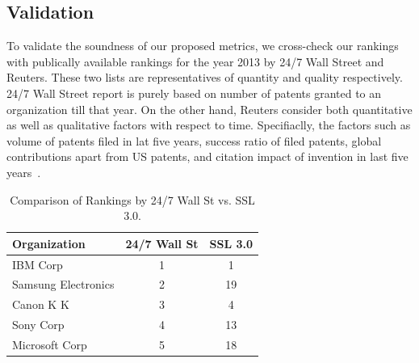\subsection{Validation}

To validate the soundness of our proposed metrics, we cross-check our rankings with publically available rankings for the year 2013 by 24/7 Wall Street and Reuters. These two lists are representatives of quantity and quality respectively. 
24/7 Wall Street report is purely based on number of patents granted to an organization till that year. 
On the other hand, Reuters consider both quantitative as well as qualitative factors with respect to time. Specifiaclly, the factors such as volume of patents filed in lat five years, success ratio of filed patents, global contributions apart from US patents, and citation impact of invention in last five years~\cite{reuters-method}. 



\begin{table}[h]
\centering
\begin{tabular}{|l|c|c|}
\hline
\textbf{Organization}        & \multicolumn{1}{l|}{\textbf{24/7 Wall St}} & \multicolumn{1}{l|}{\textbf{SSL 3.0}} \\ \hline
IBM Corp                     & 1                                          & 1                                         \\ \hline
Samsung Electronics          & 2                                          & 19                                        \\ \hline
Canon K K                    & 3                                          & 4                                         \\ \hline
Sony Corp                    & 4                                          & 13                                        \\ \hline
Microsoft Corp               & 5                                          & 18                                        \\ \hline
\end{tabular}
\caption{Comparison of Rankings by 24/7 Wall St vs. SSL 3.0.}
\label{tab:validation}
\end{table}


